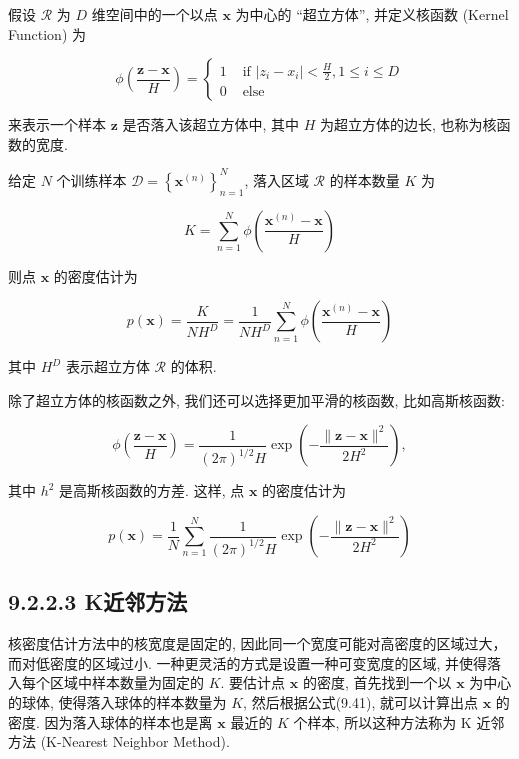 \documentclass[10pt]{article}
\begin{document}
假设 $\mathcal{R}$ 为 $D$ 维空间中的一个以点 $\boldsymbol{x}$ 为中心的 “超立方体”, 并定义核函数 (Kernel Function) 为

\[
\phi\left(\frac{\boldsymbol{z}-\boldsymbol{x}}{H}\right)= \begin{cases}1 & \text { if }\left|z_{i}-x_{i}\right|<\frac{H}{2}, 1 \leq i \leq D  \tag{9.43}\\ 0 & \text { else }\end{cases}
\]

来表示一个样本 $\boldsymbol{z}$ 是否落入该超立方体中, 其中 $H$ 为超立方体的边长, 也称为核函数的宽度.

给定 $N$ 个训练样本 $\mathcal{D}=\left\{\boldsymbol{x}^{(n)}\right\}_{n=1}^{N}$, 落入区域 $\mathcal{R}$ 的样本数量 $K$ 为


\begin{equation*}
K=\sum_{n=1}^{N} \phi\left(\frac{\boldsymbol{x}^{(n)}-\boldsymbol{x}}{H}\right) \tag{9.44}
\end{equation*}


则点 $\boldsymbol{x}$ 的密度估计为


\begin{equation*}
p(\boldsymbol{x})=\frac{K}{N H^{D}}=\frac{1}{N H^{D}} \sum_{n=1}^{N} \phi\left(\frac{\boldsymbol{x}^{(n)}-\boldsymbol{x}}{H}\right) \tag{9.45}
\end{equation*}


其中 $H^{D}$ 表示超立方体 $\mathcal{R}$ 的体积.

除了超立方体的核函数之外, 我们还可以选择更加平滑的核函数, 比如高斯核函数:


\begin{equation*}
\phi\left(\frac{\boldsymbol{z}-\boldsymbol{x}}{H}\right)=\frac{1}{(2 \pi)^{1 / 2} H} \exp \left(-\frac{\|\boldsymbol{z}-\boldsymbol{x}\|^{2}}{2 H^{2}}\right), \tag{9.46}
\end{equation*}


其中 $h^{2}$ 是高斯核函数的方差. 这样, 点 $\boldsymbol{x}$ 的密度估计为


\begin{equation*}
p(\boldsymbol{x})=\frac{1}{N} \sum_{n=1}^{N} \frac{1}{(2 \pi)^{1 / 2} H} \exp \left(-\frac{\|\boldsymbol{z}-\boldsymbol{x}\|^{2}}{2 H^{2}}\right) \tag{9.47}
\end{equation*}


\subsection*{9.2.2.3 K近邻方法}
核密度估计方法中的核宽度是固定的, 因此同一个宽度可能对高密度的区域过大，而对低密度的区域过小. 一种更灵活的方式是设置一种可变宽度的区域, 并使得落入每个区域中样本数量为固定的 $K$. 要估计点 $\boldsymbol{x}$ 的密度, 首先找到一个以 $\boldsymbol{x}$ 为中心的球体, 使得落入球体的样本数量为 $K$, 然后根据公式(9.41), 就可以计算出点 $\boldsymbol{x}$ 的密度. 因为落入球体的样本也是离 $\boldsymbol{x}$ 最近的 $K$ 个样本, 所以这种方法称为 $\mathrm{K}$ 近邻方法 (K-Nearest Neighbor Method).
\end{document}
